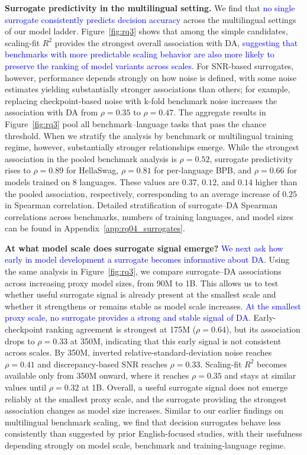\textbf{Surrogate predictivity in the multilingual setting.}
We find that \textcolor{blue}{no single surrogate consistently predicts decision accuracy} across the multilingual settings of our model ladder.
Figure~\ref{fig:rq3} shows that among the simple candidates, scaling-fit \(R^2\) provides the strongest overall association with DA, \textcolor{blue}{suggesting that benchmarks with more predictable scaling behavior are also more likely to preserve the ranking of model variants across scales.}
For SNR-based surrogates, however, performance depends strongly on how noise is defined, with some noise estimates yielding substantially stronger associations than others; for example, replacing checkpoint-based noise with k-fold benchmark noise increases the association with DA from \(\rho=0.35\) to \(\rho=0.47\).
The aggregate results in Figure~\ref{fig:rq3} pool all benchmark--language tasks that pass the chance threshold. When we stratify the analysis by benchmark or multilingual training regime, however, substantially stronger relationships emerge.
While the strongest association in the pooled benchmark analysis is \(\rho=0.52\), surrogate predictivity rises to \(\rho=0.89\) for HellaSwag, \(\rho=0.81\) for per-language BPB, and \(\rho=0.66\) for models trained on \(8\) languages.
These values are \(0.37\), \(0.12\), and \(0.14\) higher than the pooled association, respectively, corresponding to an average increase of \(0.25\) in Spearman correlation.
Detailed stratification of surrogate--DA Spearman correlations across benchmarks, numbers of training languages, and model sizes can be found in Appendix~\ref{app:rq04_surrogates}. 

\textbf{At what model scale does surrogate signal emerge?}
\textcolor{blue}{We next ask how early in model development a surrogate becomes informative about DA.}
Using the same analysis in Figure~\ref{fig:rq3}, we compare surrogate--DA associations across increasing proxy model sizes, from 90M to 1B.
This allows us to test whether useful surrogate signal is already present at the smallest scale and whether it strengthens or remains stable as model scale increases.
\textcolor{blue}{At the smallest proxy scale, no surrogate provides a strong and stable signal of DA.}
Early-checkpoint ranking agreement is strongest at 175M ($\rho=0.64$), but its association drops to $\rho=0.33$ at 350M, indicating that this early signal is not consistent across scales.
By 350M, inverted relative-standard-deviation noise reaches $\rho=0.41$ and discrepancy-based SNR reaches $\rho=0.33$.
Scaling-fit $R^2$ becomes available only from 350M onward, where it reaches $\rho=0.35$ and stays at similar values until $\rho=0.32$ at 1B.
Overall, a useful surrogate signal does not emerge reliably at the smallest proxy scale, and the surrogate providing the strongest association changes as model size increases.
Similar to our earlier findings on multilingual benchmark scaling, we find that decision surrogates behave less consistently than suggested by prior English-focused studies, with their usefulness depending strongly on model scale, benchmark and training-language regime.

